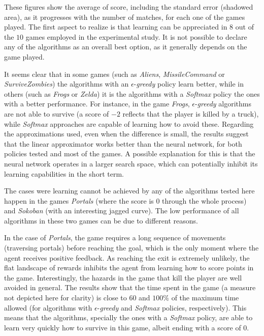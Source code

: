 \documentclass[conference]{IEEEtran}
\begin{document}
These figures show the average of score, including the standard error (shadowed area), as it progresses with the number of matches, for each one of the games played. The first aspect to realize is that learning can be appreciated in $8$ out of the $10$ games employed in the experimental study. It is not possible to declare any of the algorithms as an overall best option, as it generally depends on the game played. 

It seems clear that in some games (such as \textit{Aliens}, \textit{MissileCommand} or \textit{SurviveZombies}) the algorithms with an $\epsilon$-\textit{greedy} policy learn better, while in others (such as \textit{Frogs} or \textit{Zelda}) it is the algorithms with a \textit{Softmax} policy the ones with a better performance. For instance, in the game \textit{Frogs}, $\epsilon$-\textit{greedy} algorithms are not able to survive (a score of $-2$ reflects that the player is killed by a truck), while \textit{Softmax}  approaches are capable of learning how to avoid these. Regarding the approximations used, even when the difference is small, the results suggest that the linear approximator works better than the neural network, for both policies tested and most of the games. A possible explanation for this is that the neural network operates in a larger search space, which can potentially inhibit its learning capabilities in the short term.

The cases were learning cannot be achieved by any of the algorithms tested here happen in the games \textit{Portals} (where the score is $0$ through the whole process) and \textit{Sokoban} (with an interesting jagged curve). The low performance of all algorithms in these two games can be due to different reasons.

In the case of \textit{Portals}, the game requires a long sequence of movements (traversing portals) before reaching the goal, which is the only moment where the agent receives positive feedback. As reaching the exit is extremely unlikely, the flat landscape of rewards inhibits the agent from learning how to score points in the game. Interestingly, the hazards in the game that kill the player are well avoided in general. The results show that the time spent in the game (a measure not depicted here for clarity) is close to $60$ and $100\%$ of the maximum time allowed (for algorithms with $\epsilon$-\textit{greedy} and \textit{Softmax} policies, respectively). This means that the algorithms, specially the ones with a \textit{Softmax} policy, are able to learn very quickly how to survive in this game, albeit ending with a score of $0$.
\end{document}
